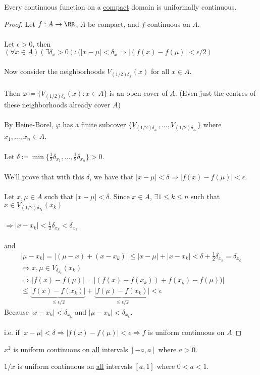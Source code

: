 \documentclass[class=scrartcl, crop=false]{standalone}
\begin{document}
\begin{theorem}
  Every continuous function on a \ul{compact} domain is uniformally continuous.
  \begin{proof}
    Let $f : A \to \RR$, $A$ be compact, and $f$ continuous on $A$.
    \\\\
    Let $\epsilon > 0$, then $(\forall x \in A) (\exists \delta_x > 0) : (|x - \mu| < \delta_x \Rightarrow |(f(x) - f(\mu)| < \epsilon / 2)$
    \\\\
    Now consider the neighborhoods  $V_{(1 / 2) \delta_x} (x)$ for all $x \in A$.
    \\\\
    Then $\varphi \coloneqq \{V_{(1 / 2)\delta_x}(x) : x \in A\}$ is an open cover of $A$. (Even just the centres of these neighborhoods already cover $A$)
    \\\\
    By Heine-Borel, $\varphi$ has a finite subcover $\{V_{(1 / 2)\delta_{x_1}}, \dots, V_{(1 / 2)\delta_{x_n}}\}$ where $x_1, \dots, x_n \in A$.
    \\\\
    Let $\delta \coloneqq \min\{\frac{1}{2} \delta_{x_1}, \dots, \frac{1}{2} \delta_{x_n}\} > 0$.
    \\\\
    We'll prove that with this $\delta$, we have that $|x - \mu| < \delta \Rightarrow |f(x) - f(\mu)| < \epsilon$.
    \\\\
    Let $x, \mu \in A$ such that $|x - \mu| < \delta$. Since $x \in A$, $\exists 1 \leq k \leq n$ such that $x \in V_{(1 / 2)\delta_{x_k}}(x_k)$
    \\\\
    $\Rightarrow |x - x_k| < \frac{1}{2} \delta_{x_k} < \delta_{x_k}$ 
    \\\\
    and
    \begin{gather*}
      |\mu - x_k| = |(\mu - x) + (x - x_k)| \leq |x - \mu| + |x - x_k| < \delta + \frac{1}{2}\delta_{x_k} = \delta_{x_k} \\
      \Rightarrow x, \mu \in V_{\delta_{x_k}}(x_k) \\
      \Rightarrow
      |f(x) - f(\mu)| = |(f(x) - f(x_k)) + f(x_k) - f(\mu))|
      \\ \leq
      \underbrace{|f(x) - f(x_k)|}_{\leq \epsilon / 2} + \underbrace{|f(\mu) - f(x_k)|}_{\leq \epsilon / 2} < \epsilon
    \end{gather*} 
    Because $|x - x_k| < \delta_{x_k}$ and $|\mu - x_k| < \delta_{x_k}$.
    \\\\
    i.e. if $|x - \mu| < \delta \Rightarrow |f(x) - f(\mu)| < \epsilon \Rightarrow f$ is uniform continuous on $A$
  \end{proof} 
\end{theorem} 

\begin{example}
  $x^2$ is uniform continuous on \ul{all} intervals $[-a, a]$ where $a > 0$.
\end{example} 
\begin{example}
  $1 / x$ is uniform continuous on \ul{all} intervals $[a, 1]$ where $0 < a < 1$.
\end{example} 
\end{document}
